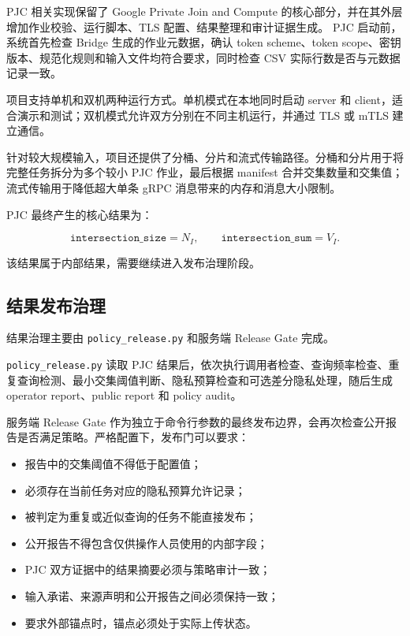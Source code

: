 \documentclass[UTF8,a4paper,12pt,oneside]{ctexrep}
\begin{document}
PJC 相关实现保留了 Google Private Join and Compute 的核心部分，并在其外层增加作业校验、运行脚本、TLS 配置、结果整理和审计证据生成。
PJC 启动前，系统首先检查 Bridge 生成的作业元数据，确认 token scheme、token scope、密钥版本、规范化规则和输入文件均符合要求，同时检查 CSV 实际行数是否与元数据记录一致。

项目支持单机和双机两种运行方式。单机模式在本地同时启动 server 和 client，适合演示和测试；双机模式允许双方分别在不同主机运行，并通过 TLS 或 mTLS 建立通信。

针对较大规模输入，项目还提供了分桶、分片和流式传输路径。分桶和分片用于将完整任务拆分为多个较小 PJC 作业，最后根据 manifest 合并交集数量和交集值；流式传输用于降低超大单条 gRPC 消息带来的内存和消息大小限制。

PJC 最终产生的核心结果为：

\begin{equation}
\texttt{intersection\_size}=N_I,
\qquad
\texttt{intersection\_sum}=V_I.
\end{equation}

该结果属于内部结果，需要继续进入发布治理阶段。

\subsection{结果发布治理}

结果治理主要由 \texttt{policy\_release.py} 和服务端 Release Gate 完成。

\texttt{policy\_release.py} 读取 PJC 结果后，依次执行调用者检查、查询频率检查、重复查询检测、最小交集阈值判断、隐私预算检查和可选差分隐私处理，随后生成 operator report、public report 和 policy audit。

服务端 Release Gate 作为独立于命令行参数的最终发布边界，会再次检查公开报告是否满足策略。严格配置下，发布门可以要求：

\begin{itemize}
  \item 报告中的交集阈值不得低于配置值；
  \item 必须存在当前任务对应的隐私预算允许记录；
  \item 被判定为重复或近似查询的任务不能直接发布；
  \item 公开报告不得包含仅供操作人员使用的内部字段；
  \item PJC 双方证据中的结果摘要必须与策略审计一致；
  \item 输入承诺、来源声明和公开报告之间必须保持一致；
  \item 要求外部锚点时，锚点必须处于实际上传状态。
\end{itemize}
\end{document}
